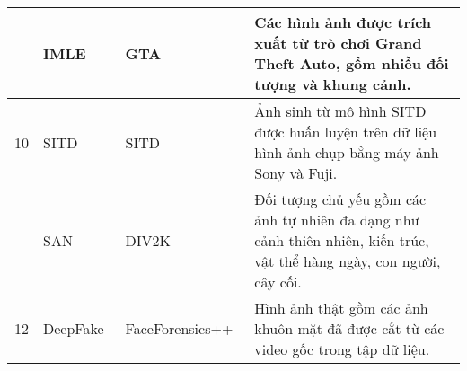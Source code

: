 \begin{table}[ht!]
\begin{adjustbox}{max width=\textwidth}
\begin{tabular}{c p{2cm} p{3cm} p{8.5cm}}
			\hdashline
			9 & IMLE~\cite{li2019diverse} & GTA~\cite{barua2025gta} & Các hình ảnh được trích xuất từ trò chơi Grand Theft Auto, gồm nhiều đối tượng và khung cảnh. \\
			\midrule
			10 & SITD~\cite{sitd} & SITD~\cite{sitd} & Ảnh sinh từ mô hình SITD được huấn luyện trên dữ liệu hình ảnh chụp bằng máy ảnh Sony và Fuji. \\
			\hdashline
			11 & SAN~\cite{8954252} & DIV2K~\cite{Agustsson_2017_CVPR_Workshops} & Đối tượng chủ yếu gồm các ảnh tự nhiên đa dạng như cảnh thiên nhiên, kiến trúc, vật thể hàng ngày, con người, cây cối. \\
			\midrule
			12 & DeepFake~\cite{rossler2019faceforensics++} & FaceForensics++~\cite{faceforensicslearningdetectmanipulated} & Hình ảnh thật gồm các ảnh khuôn mặt đã được cắt từ các video gốc trong tập dữ liệu.\\
			\bottomrule
		\end{tabular}
	\end{adjustbox}
\end{table}


